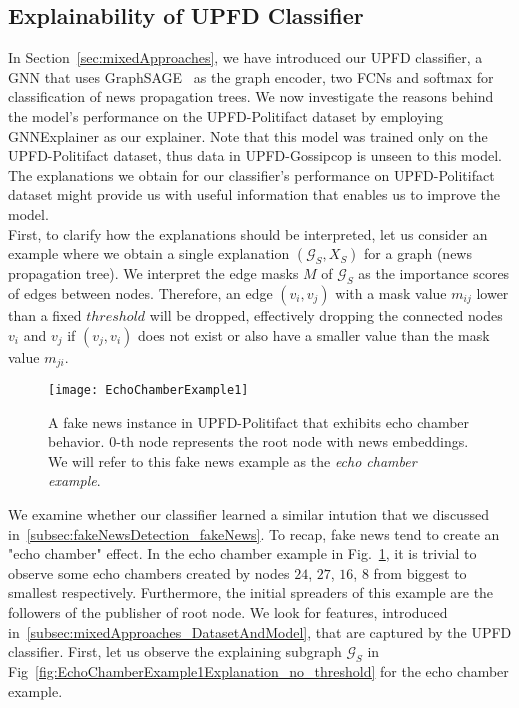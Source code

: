 \subsection{Explainability of UPFD Classifier}
\label{subsec:ExplaniningGNNs_ExplainingUPFDClassifier}
In Section~\ref{sec:mixedApproaches}, we have introduced our UPFD classifier, a GNN that uses GraphSAGE~\parencite{GraphSAGE_Hamilton} as the graph encoder, two FCNs and softmax for classification of news propagation trees. We now investigate the reasons behind the model's performance on the UPFD-Politifact dataset by employing GNNExplainer as our explainer. Note that this model was trained only on the UPFD-Politifact dataset, thus data in UPFD-Gossipcop is unseen to this model. The explanations we obtain for our classifier's performance on UPFD-Politifact dataset might provide us with useful information that enables us to improve the model.\\
First, to clarify how the explanations should be interpreted, let us consider an example where we obtain a single explanation $(\mathcal{G}_S, X_S)$ for a graph (news propagation tree). We interpret the edge masks $M$ of $\mathcal{G}_S$ as the importance scores of edges between nodes. Therefore, an edge $(v_i, v_j)$ with a mask value $m_{ij}$ lower than a fixed $threshold$ will be dropped, effectively dropping the connected nodes $v_i$ and $v_j$ if $(v_j, v_i)$ does not exist or also have a smaller value than the mask value $m_{ji}$.\\
\begin{figure}
    \centering
    \texttt{[image: EchoChamberExample1]}
    \caption[Echo chamber example from UPFD-Politifact.]{A fake news instance in UPFD-Politifact that exhibits echo chamber behavior. $0$-th node represents the root node with news embeddings. We will refer to this fake news example as the \emph{echo chamber example}.}
    \label{fig:echoChamberExample1}
\end{figure}
We examine whether our classifier learned a similar intution that we discussed in~\ref{subsec:fakeNewsDetection_fakeNews}. To recap, fake news tend to create an "echo chamber" effect. In the echo chamber example in Fig.~\ref{fig:echoChamberExample1}, it is trivial to observe some echo chambers created by nodes $24$, $27$, $16$, $8$ from biggest to smallest respectively. Furthermore, the initial spreaders of this example are the followers of the publisher of root node. We look for features, introduced in~\ref{subsec:mixedApproaches_DatasetAndModel}, that are captured by the UPFD classifier. First, let us observe the explaining subgraph $\mathcal{G}_S$ in Fig~\ref{fig:EchoChamberExample1Explanation_no_threshold} for the echo chamber example.\\
